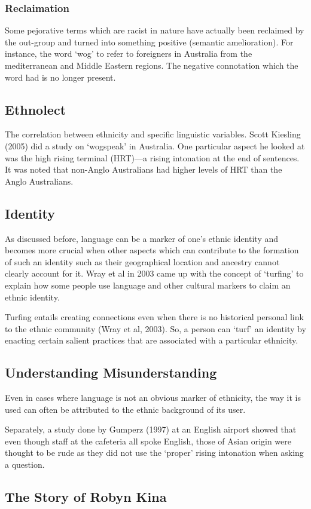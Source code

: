 \documentclass[../main.tex]{subfiles}
\begin{document}
    \subsubsection{Reclaimation}
    Some pejorative terms which are racist in nature have actually been reclaimed by the out-group and turned into something positive (semantic amelioration). For instance, the word `wog' to refer to foreigners in Australia from the mediterranean and Middle Eastern regions. The negative connotation which the word had is no longer present. 

    \subsection{Ethnolect}
    The correlation between ethnicity and specific linguistic variables. Scott Kiesling (2005) did a study on `wogspeak' in Australia. One particular aspect he looked at was the high rising terminal (HRT)---a rising intonation at the end of sentences. It was noted that non-Anglo Australians had higher levels of HRT than the Anglo Australians.

    \subsection{Identity}
    As discussed before, language can be a marker of one's ethnic identity and becomes more crucial when other aspects which can contribute to the formation of such an identity such as their geographical location and ancestry cannot clearly account for it. Wray et al in 2003 came up with the concept of `turfing' to explain how some people use language and other cultural markers to claim an ethnic identity. \par

    Turfing entails creating connections even when there is no historical personal link to the ethnic community (Wray et al, 2003). So, a person can `turf' an identity by enacting certain salient practices that are associated with a particular ethnicity.

    \subsection{Understanding Misunderstanding}
    Even in cases where language is not an obvious marker of ethnicity, the way it is used can often be attributed to the ethnic background of its user. \par

    Separately, a study done by Gumperz (1997) at an English airport showed that even though staff at the cafeteria all spoke English, those of Asian origin were thought to be rude as they did not use the `proper' rising intonation when asking a question.

    \subsection{The Story of Robyn Kina}
    
\end{document}
